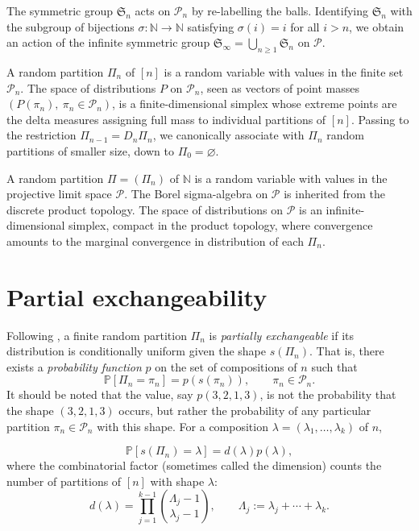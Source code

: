 \documentclass{article}
\begin{document}
The symmetric group ${\mathfrak S}_n$ acts on ${\mathcal P}_n$ by re-labelling the balls.
Identifying ${\mathfrak S}_n$ with the subgroup of bijections $\sigma:\mathbb N\to\mathbb N$ satisfying $\sigma(i)=i$ for all $i>n$, we obtain an action of the infinite symmetric group
${\mathfrak S}_\infty=\bigcup_{n\ge1}{\mathfrak S}_n$
on $\mathcal P$.


A random partition $\Pi_n$ of $[n]$ is a random variable with values in the
finite set $\mathcal P_n$.
The space of distributions $P$ on $\mathcal P_n$, seen as vectors of point masses $(P(\pi_n), ~\pi_n\in{\mathcal P}_n)$,     is a finite-dimensional simplex
whose extreme points are the delta measures assigning full mass to individual
partitions of $[n]$.
Passing to the restriction $\Pi_{n-1}=D_n\Pi_n$, we canonically associate with
$\Pi_n$ random partitions of smaller size, down to $\Pi_0=\varnothing$.

A random partition $\Pi=(\Pi_n)$ of $\mathbb N$ is a random variable with
values in the projective limit space  $\mathcal P$.
The Borel sigma-algebra on $\mathcal P$ is inherited from the discrete product topology.
The space of distributions on $\mathcal P$ is an infinite-dimensional simplex,
compact in the product topology, where convergence amounts 
to the marginal convergence in distribution of each $\Pi_n$. 



\section{Partial exchangeability}\label{PE}

\noindent
Following  \cite{PitmanPTRF},
a  finite random partition $\Pi_n$ is {\it partially exchangeable} if its distribution
is conditionally uniform given the shape $s(\Pi_n)$.
That is, there exists a {\it probability function} $p$ on the set of compositions of $n$
such that
$$
{\mathbb P}[\Pi_n=\pi_n]=p(s(\pi_n)), \qquad \pi_n\in{\mathcal P}_n.
$$
It should be noted that the value, say $p(3,2,1,3)$, is not the probability that
the shape $(3,2,1,3)$ occurs, but rather the probability of any particular partition $\pi_n\in{\mathcal P}_n$
with this shape.
For a composition $\lambda=(\lambda_1,\ldots,\lambda_k)$ of $n$, 

\begin{equation}\label{Pp}
{\mathbb P}[s(\Pi_n)=\lambda] =d(\lambda)p(\lambda),
\end{equation}
where the combinatorial factor (sometimes called the dimension) counts the number of partitions of $[n]$ with shape $\lambda$:
\begin{equation}\label{dim-pe}
d(\lambda)
=
\prod_{j=1}^{k-1}
{\Lambda_j-1\choose\lambda_j-1},
\qquad
\Lambda_j:=\lambda_j+\cdots+\lambda_k.
\end{equation}
\end{document}
